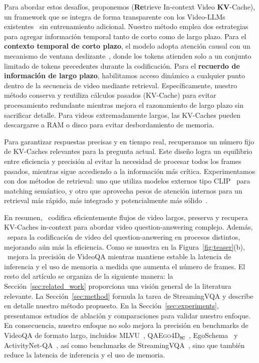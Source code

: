 

Para abordar estos desafíos, proponemos \textbf{\ourmethod} (\textbf{Re}trieve In-context Video \textbf{KV}-Cache), un framework que se integra de forma transparente con los Video-LLMs existentes~\citep{video_chatgpt, llava_next_video, llava_onevision} sin entrenamiento adicional. 
Nuestro método emplea dos estrategias para agregar información temporal tanto de corto como de largo plazo. 
Para el \textbf{contexto temporal de corto plazo}, 
el modelo adopta atención causal con un mecanismo de ventana deslizante~\citep{lm_infinite}, donde los tokens atienden solo a un conjunto limitado de tokens precedentes durante la codificación.  
Para el \textbf{recuerdo de información de largo plazo}, 
habilitamos acceso dinámico a cualquier punto dentro de la secuencia de video mediante retrieval. 
Específicamente, nuestro método conserva y reutiliza cálculos pasados (KV-Cache) para evitar procesamiento redundante mientras mejora el razonamiento de largo plazo sin sacrificar detalle. Para videos extremadamente largos, las KV-Caches pueden descargarse a RAM o disco para evitar desbordamiento de memoria.

Para garantizar respuestas precisas y en tiempo real, recuperamos un número fijo de KV-Caches relevantes para la pregunta actual. Este diseño logra un equilibrio entre eficiencia y precisión al evitar la necesidad de procesar todos los frames pasados, mientras sigue accediendo a la información más crítica. Experimentamos con dos métodos de retrieval: uno que utiliza modelos externos tipo CLIP~\citep{clip, siglip} para matching semántico, y otro que aprovecha pesos de atención internos para un retrieval más rápido, más integrado y potencialmente más sólido~\citep{infllm, snapkv}.

En resumen, {\ourmethod}~codifica eficientemente flujos de video largos, 
preserva y recupera KV-Caches in-context para abordar video question-answering complejo. Además, {\ourmethod}~separa la codificación de video del question-answering en procesos distintos, mejorando aún más la eficiencia. Como se muestra en la Figura~\ref{fig:teaser}(b), {\ourmethod}~mejora la precisión de VideoQA mientras mantiene estable la latencia de inferencia y el uso de memoria a medida que aumenta el número de frames. 
El resto del artículo se organiza de la siguiente manera: 
la Sección~\ref{sec:related_work} proporciona una visión general de la literatura relevante. 
La Sección~\ref{sec:method} formula la tarea de StreamingVQA y describe en detalle nuestro método propuesto. En la Sección~\ref{sec:experiments}, presentamos estudios de ablación y comparaciones para validar nuestro enfoque. En consecuencia, nuestro enfoque no solo mejora la precisión en benchmarks de VideoQA de formato largo, incluidos MLVU~\citep{mlvu}, \textsc{QAEgo4D$_\texttt{MC}$}~\citep{di2023groundvqa}, EgoSchema~\citep{egoschema} y ActivityNet-QA~\citep{activitynet_qa}, así como benchmarks de StreamingVQA~\citep{flashvstream}, sino que también reduce la latencia de inferencia y el uso de memoria. 

